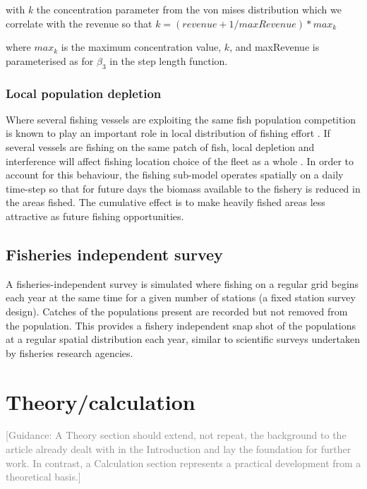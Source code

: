 \documentclass[review]{elsarticle}
\begin{document}
with $k$ the concentration parameter from the von mises distribution which we
correlate with the revenue so that $k = (revenue + 1 / maxRevenue) * max_{k}$

where $max_{k}$ is the maximum concentration value, $k$, and maxRevenue is
parameterised as for $\beta_{3}$ in the step length function. \\

\subsubsection{Local population depletion}

Where several fishing vessels are exploiting the same fish population
competition is known to play an important role in local distribution of fishing
effort \cite{Gillis1998}. If several vessels are fishing on the same patch of
fish, local depletion and interference will affect fishing location choice of
the fleet as a whole \cite{Rijnsdorp2000, Poos2007a}. In order to account for
this behaviour, the fishing sub-model operates spatially on a daily time-step
so that for future days the biomass available to the fishery is reduced in the
areas fished. The cumulative effect is to make heavily fished areas less
attractive as future fishing opportunities. \\

\subsection{Fisheries independent survey}

A fisheries-independent survey is simulated where fishing on a regular grid
begins each year at the same time for a given number of stations (a fixed
station survey design). Catches of the populations present are recorded but not
removed from the population. This provides a fishery independent snap shot of
the populations at a regular spatial distribution each year, similar to
scientific surveys undertaken by fisheries research agencies. \\

\section{Theory/calculation}

\textcolor{gray}{[Guidance: A Theory section should extend, not repeat, 
the background to the article already dealt with in the Introduction and lay
the foundation for further work.  In contrast, a Calculation section represents
a practical development from a theoretical basis.] \\}
\end{document}
